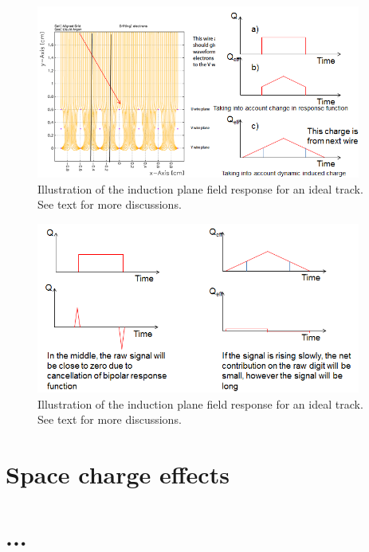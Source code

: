 \begin{figure}[!h!tbp]
\includegraphics[width=0.95\textwidth]{figures/ideal_track.png}
\caption{Illustration of the induction plane field response for an ideal track. See text for more 
discussions. }
\label{fig:ideal_track_1}
\end{figure}

\begin{figure}[!h!tbp]
\includegraphics[width=0.95\textwidth]{figures/ideal_track_2.png}
\caption{Illustration of the induction plane field response for an ideal track. See text for more 
discussions.}
\label{fig:ideal_track_2}
\end{figure}



\section{Space charge effects}

\section{...}
